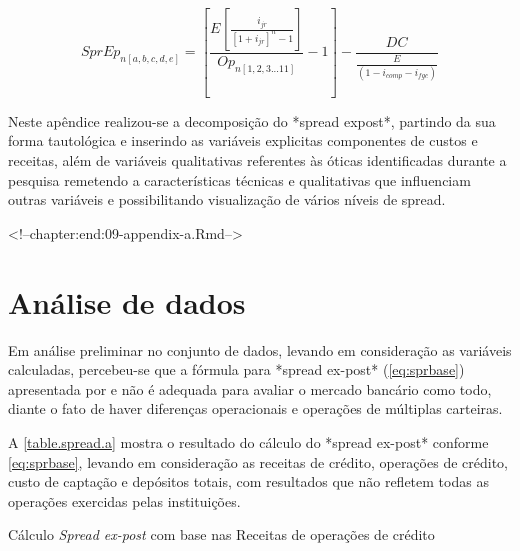 \documentclass[
  12pt,
  12pt,
  openright,
  oneside,
  a4paper,
  chapter=TITLE,
  section=TITLE,
  subsection=TITLE,
  subsubsection=TITLE,
  english,
  portugues,
  sumario=tradicional]{abntex2}
\begin{document}
\begin{apendicesenv}
\begin{equation}\label{eq:oper02}
SprEp_{n[a,b,c,d,e]} =  [\frac{E_{}[\frac{   i_{jr}  }{  [1 + i_{jr}]^n -1  }] }{Op_{n[1,2,3...11]}} -1] - \frac{DC_{}}{\frac{E_{}}{(1 - i_{comp} - i_{fgc})}}
\end{equation}


Neste apêndice realizou-se a decomposição do *spread expost*, partindo da sua forma tautológica e inserindo as variáveis explicitas componentes de custos e receitas, além de variáveis qualitativas referentes às óticas identificadas durante a pesquisa remetendo a características técnicas e qualitativas que influenciam outras variáveis e possibilitando visualização de vários níveis de spread. 


<!--chapter:end:09-appendix-a.Rmd-->

\chapter{Análise de dados}\label{apendiceb}

Em análise preliminar no conjunto de dados, levando em consideração as variáveis calculadas, percebeu-se que a fórmula para *spread ex-post* (\autoref{eq:sprbase}) apresentada por \textcite{dantas:2012} e \textcite{timotio:2018} não é adequada para avaliar o mercado bancário como todo, diante o fato de haver diferenças operacionais e operações de múltiplas carteiras. 

A \autoref{table.spread.a} mostra o resultado do cálculo do *spread ex-post* conforme \autoref{eq:sprbase}, levando em consideração as receitas de crédito, operações de crédito, custo de captação e depósitos totais, com resultados que não refletem todas as operações exercidas pelas instituições.

\begin{table}
\caption{Cálculo \emph{Spread ex-post} com base nas Receitas de operações de crédito}
\vspace{1mm}
\begingroup\fontsize{10}{12}\selectfont


\end{table}
\end{apendicesenv}
\end{document}
